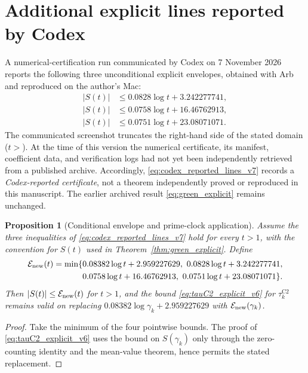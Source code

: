 \documentclass[11pt,reqno]{amsart}
\numberwithin{equation}{section}
\newtheorem{proposition}[theorem]{Proposition}
\theoremstyle{definition}
\theoremstyle{remark}
\newcommand{\GreenC}{2.959227629}
\newcommand{\GreenA}{0.08382}
\begin{document}
\section{Additional explicit lines reported by Codex}
\label{sec:codex_new_lines_v7}
A numerical-certification run communicated by Codex on
7 November 2026 reports the following three unconditional
explicit envelopes, obtained with Arb and reproduced on the
author's Mac:
\begin{equation}
\begin{aligned}
 |S(t)|&\le0.0828\log t+3.242277741,\\
 |S(t)|&\le0.0758\log t+16.46762913,\\
 |S(t)|&\le0.0751\log t+23.08071071.
\end{aligned}
\label{eq:codex_reported_lines_v7}
\end{equation}
The communicated screenshot truncates the right-hand side
of the stated domain ($t>$). At the time of this version
the numerical certificate, its manifest, coefficient
data, and verification logs had not yet been independently
retrieved from a published archive. Accordingly,
\eqref{eq:codex_reported_lines_v7} records a
\emph{Codex-reported certificate}, not a theorem
independently proved or reproduced in this manuscript.
The earlier archived result \eqref{eq:green_explicit}
remains unchanged.

\begin{proposition}[Conditional envelope and prime-clock application]
\label{prop:codex_envelope_v7}
Assume the three inequalities of
\eqref{eq:codex_reported_lines_v7} hold for every $t>1$,
with the convention for $S(t)$ used in
Theorem~\ref{thm:green_explicit}. Define
\begin{equation}
\begin{split}
 \mathcal E_{\rm new}(t)=\min\{&
 0.08382\log t+2.959227629,\ 
 0.0828\log t+3.242277741,\\
 &0.0758\log t+16.46762913,\ 
 0.0751\log t+23.08071071\}.
\end{split}
\label{eq:codex_envelope_v7}
\end{equation}
Then $|S(t)|\le\mathcal E_{\rm new}(t)$ for $t>1$,
and the bound \eqref{eq:tauC2_explicit_v6} for
$\tau_k^{\mathrm{C2}}$ remains valid on replacing
$\GreenA\log\gamma_k+\GreenC$ with
$\mathcal E_{\rm new}(\gamma_k)$.
\end{proposition}
\begin{proof}
Take the minimum of the four pointwise bounds.
The proof of \eqref{eq:tauC2_explicit_v6}
uses the bound on $S(\gamma_k)$ only through the
zero-counting identity and the mean-value theorem,
hence permits the stated replacement.
\end{proof}
\end{document}
